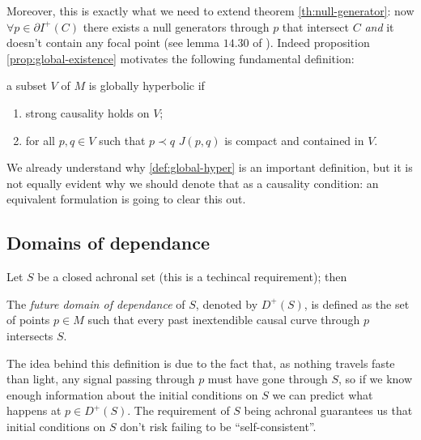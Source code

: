 Moreover, this is exactly what we need to extend theorem \ref{th:null-generator}: now \(\forall p\in \partial I^+(C)\)  there exists a null generators through \(p\) that intersect \(C\) \emph{and} it doesn't contain any focal point (see lemma \(14.30\) of \cite{o1983semi}).
Indeed proposition \ref{prop:global-existence} motivates the following fundamental definition:
\begin{definition}
	\label{def:global-hyper}
	a subset \(V\) of \(M\) is globally hyperbolic if 
	\begin{enumerate}
		\item strong causality holds on \(V\);
  		\item for all \(p, q \in V\) such that \(p \prec q\) \(J(p,q)\) is compact and contained in \(V\).
	\end{enumerate}
\end{definition}

We already understand why \ref{def:global-hyper} is an important definition, but it is not equally evident why we should denote that as a causality condition: an equivalent formulation is going to clear this out.

\subsection{Domains of dependance}
Let \(S\) be a closed achronal set (this is a techincal requirement); then
\begin{definition}
	The \emph{future domain of dependance} of \(S\), denoted by \(D^+(S)\), is defined as
	the set of points \(p\in M\) such that every past inextendible causal curve through \(p\) intersects \(S\).
\end{definition}

The idea behind this definition is due to the fact that, as nothing travels faste than light, any signal passing through \(p\) must have gone through \(S\), so if we know enough information about the initial conditions on \(S\) we can predict what happens at \(p\in D^+(S)\). The requirement of \(S\) being achronal guarantees us that initial conditions on \(S\) don't risk failing to be ``self-consistent''.


